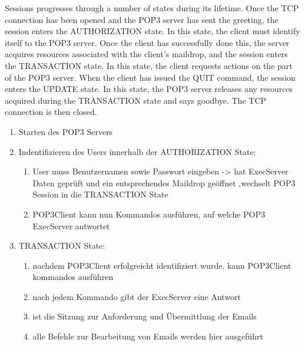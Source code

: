 \documentclass[11pt]{article}
\begin{document}
    Sessions progresses through a number of states during its
    lifetime.  Once the TCP connection has been opened and the POP3
    server has sent the greeting, the session enters the AUTHORIZATION
    state.  In this state, the client must identify itself to the POP3
    server.  Once the client has successfully done this, the server
    acquires resources associated with the client's maildrop, and the
    session enters the TRANSACTION state.  In this state, the client
    requests actions on the part of the POP3 server.  When the client has
    issued the QUIT command, the session enters the UPDATE state.  In
    this state, the POP3 server releases any resources acquired during
    the TRANSACTION state and says goodbye.  The TCP connection is then
    closed.


    \begin{enumerate}

        \item Starten des POP3 Servers
        \item Indentifizieren des Users innerhalb der AUTHORIZATION State:
        \begin{enumerate}
            \item User muss Benutzernamen sowie Passwort eingeben -> hat ExecServer
            Daten geprüft und ein entsprechendes Maildrop geöffnet ,wechselt POP3
            Session in die TRANSACTION State
            \item POP3Client kann nun Kommandos ausführen, auf welche POP3 ExecServer antwortet

        \end{enumerate}

        \item TRANSACTION State:
        \begin{enumerate}
            \item nachdem POP3Client erfolgreicht identifiziert wurde, kann POP3Client kommandos ausführen
            \item nach jedem Kommando gibt der ExecServer eine Antwort
            \item ist die Sitzung zur Anforderung und Übermittlung der Emails
            \item alle Befehle zur Bearbeitung von Emails werden hier ausgeführt
        \end{enumerate}


\end{enumerate}
\end{document}
